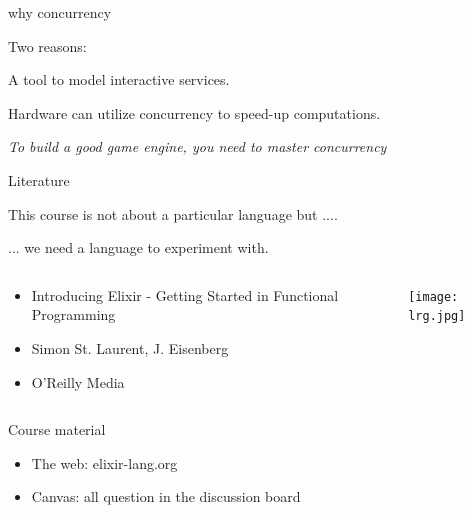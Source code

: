 \begin{frame}{why concurrency}

Two reasons:

\pause\vspace{20pt}\hspace{60pt}A tool to model interactive services.

\pause\vspace{20pt}\hspace{60pt}Hardware can utilize concurrency to speed-up computations.

\pause\vspace{40pt}
{\em To build a good game engine, you need to master concurrency}

\end{frame}


\begin{frame}{Literature}

  This course is not about a particular language but .... \pause

  \vspace{20pt}\hspace{40pt} ... we need a language to experiment with.

\pause
\begin{columns}
 \begin{column}{0.6\linewidth}
   \begin{itemize}
   \item Introducing Elixir - Getting Started in Functional Programming
   \item Simon St. Laurent, J. Eisenberg
   \item O'Reilly Media
   \end{itemize}
 \end{column}
 \begin{column}{0.4\linewidth}
    \texttt{[image: lrg.jpg]}
 \end{column}
\end{columns}

\end{frame}

\begin{frame}{Course material}

  \begin{itemize}
   \item The web:  elixir-lang.org
   \item Canvas: all question in the discussion board
  \end{itemize}  

\end{frame}


